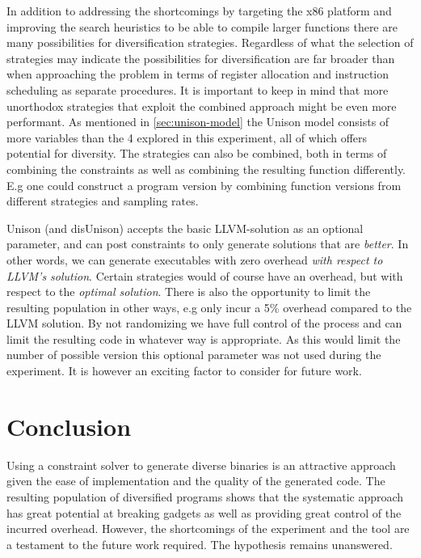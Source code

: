In addition to addressing the shortcomings by targeting the x86 platform and improving
the search heuristics to be able to compile larger functions there are many possibilities
for diversification strategies. Regardless of what the selection of strategies may
indicate the possibilities for diversification are far broader than when approaching the
problem in terms of register allocation and instruction scheduling as separate procedures.
It is important to keep in mind that more unorthodox strategies that exploit the combined
approach might be even more performant. As mentioned in \ref{sec:unison-model} the Unison
model consists of more variables than the 4 explored in this experiment, all of which
offers potential for diversity. The strategies can also be combined, both in terms of
combining the constraints as well as combining the resulting function differently. E.g one
could construct a program version by combining function versions from different strategies
and sampling rates.

Unison (and disUnison) accepts the basic LLVM-solution as an optional parameter, and can
post constraints to only generate solutions that are \textit{better}. In other words, we
can generate executables with zero overhead \textit{with respect to LLVM's solution}.
Certain strategies would of course have an overhead, but with respect to the
\textit{optimal solution}. There is also the opportunity to limit the resulting population
in other ways, e.g only incur a 5\% overhead compared to the LLVM solution. By not
randomizing we have full control of the process and can limit the resulting code in
whatever way is appropriate. As this would limit the number of possible version this
optional parameter was not used during the experiment. It is however an exciting factor
to consider for future work.

\section{Conclusion}

Using a constraint solver to generate diverse binaries is an attractive approach given
the ease of implementation and the quality of the generated code. The resulting population
of diversified programs shows that the systematic approach has great potential at breaking
gadgets as well as providing great control of the incurred overhead. However, the
shortcomings of the experiment and the tool are a testament to the future work required.
The hypothesis remains unanswered.
